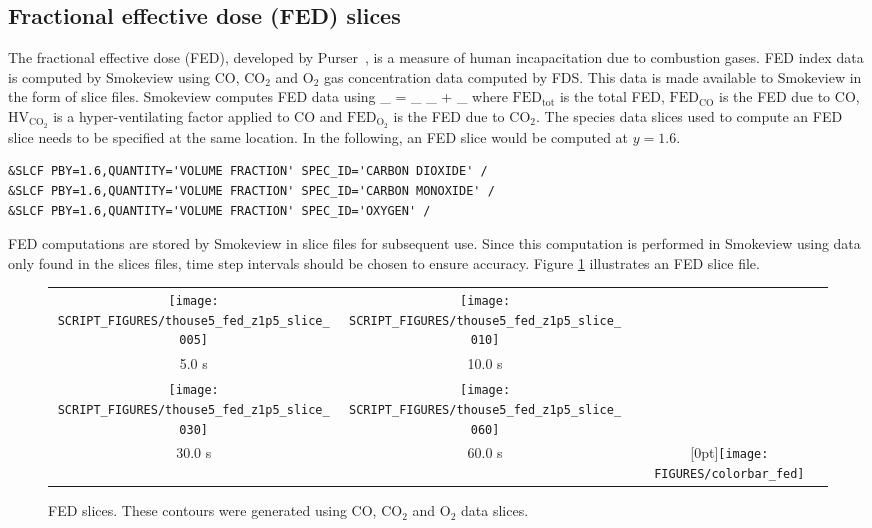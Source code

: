 \documentclass[11pt,twoside]{book}
\begin{document}
\subsection{Fractional effective dose (FED) slices}
The fractional effective dose (FED), developed by Purser~\cite{SFPE:Purser}, is a measure of human incapacitation
due to combustion gases.
FED index data is computed by Smokeview using CO, $\mathrm{CO_2}$ and $\mathrm{O_2}$ gas
concentration data computed by FDS.
This data is made available to Smokeview in the form of slice files.
Smokeview computes FED data using
\be
{}_ = _ \times {}_ + _
\ee
where $\mathrm{FED}_\mathrm{tot}$ is the total FED, $\mathrm{FED}_\mathrm{CO}$ is the FED due to CO,
$\mathrm{HV}_\mathrm{CO_2}$ is a hyper-ventilating factor applied to CO and $\mathrm{FED}_\mathrm{O_2}$
is the FED due to $\mathrm{CO_2}$.
The species data slices used to compute an FED slice needs to be specified at the
same location.  In the following, an FED slice would be computed at $y=1.6$.
\begin{lstlisting}
&SLCF PBY=1.6,QUANTITY='VOLUME FRACTION' SPEC_ID='CARBON DIOXIDE' /
&SLCF PBY=1.6,QUANTITY='VOLUME FRACTION' SPEC_ID='CARBON MONOXIDE' /
&SLCF PBY=1.6,QUANTITY='VOLUME FRACTION' SPEC_ID='OXYGEN' /
\end{lstlisting}

FED computations are stored by Smokeview in slice files for subsequent use.
Since this computation
is performed in Smokeview using data only found in the slices files, time step intervals
should be chosen to ensure accuracy.  Figure \ref{figfedslice} illustrates
an FED slice file.

\begin{figure}[\figoptions]
\begin{center}
\begin{tabular}{ccc}
\texttt{[image: SCRIPT\_FIGURES/thouse5\_fed\_z1p5\_slice\_005]}&
\texttt{[image: SCRIPT\_FIGURES/thouse5\_fed\_z1p5\_slice\_010]}\\
5.0 s&10.0 s\\
\texttt{[image: SCRIPT\_FIGURES/thouse5\_fed\_z1p5\_slice\_030]}&
\texttt{[image: SCRIPT\_FIGURES/thouse5\_fed\_z1p5\_slice\_060]}&\\
30.0 s&60.0 s
&\raisebox{0.0ex}[0pt]{\texttt{[image: FIGURES/colorbar\_fed]}}\\
\end{tabular}
\caption [FED slices.]
{FED slices.
These contours were generated using CO, $\mathrm{CO_2}$ and $\mathrm{O_2}$ data slices.
}
\label{figfedslice}%
\end{center}
\end{figure}
\end{document}
